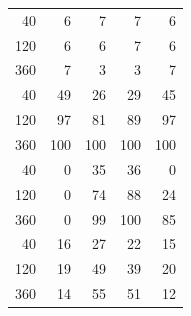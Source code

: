 \begin{tabular}{rrrrr}
40 & 6 & 7 & 7 & 6 \\
120 & 6 & 6 & 7 & 6 \\
360 & 7 & 3 & 3 & 7 \\
40 & 49 & 26 & 29 & 45 \\
120 & 97 & 81 & 89 & 97 \\
360 & 100 & 100 & 100 & 100 \\
40 & 0 & 35 & 36 & 0 \\
120 & 0 & 74 & 88 & 24 \\
360 & 0 & 99 & 100 & 85 \\
40 & 16 & 27 & 22 & 15 \\
120 & 19 & 49 & 39 & 20 \\
360 & 14 & 55 & 51 & 12 \\
\end{tabular}
